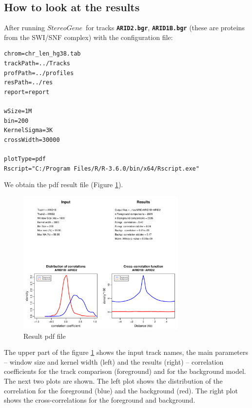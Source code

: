\documentclass{article}
\newcommand{\tw}{\textwidth}
\newcommand{\prm}[1]{\texttt{\textbf{{#1}}}}
\newcommand{\sg}{$StereoGene$\ }
\begin{document}
\subsection{How to look at the results}
After running \sg for tracks \prm{ARID2.bgr}, \prm{ARID1B.bgr} (these are proteins from the SWI/SNF complex) with the configuration file:
\begin{shaded} 
\begin{footnotesize}
\begin{verbatim}
chrom=chr_len_hg38.tab
trackPath=../Tracks
profPath=../profiles
resPath=../res
report=report

wSize=1M
bin=200
KernelSigma=3K
crossWidth=30000

plotType=pdf
Rscript="C:/Program Files/R/R-3.6.0/bin/x64/Rscript.exe"
\end{verbatim}
\end{footnotesize}
\end{shaded}
We obtain the pdf result file (Figure \ref{res1}).
\begin{center}
\begin{figure}[!h]
\includegraphics[width=0.75\tw]{fig/ARID1B~ARID2.pdf}
\caption{Result pdf file}\label{res1}
\end{figure}
\end{center}


The upper part of the figure \ref{res1} shows the input track names, the main parameters -- window size and kernel width (left) and the results (right) -- correlation coefficients for the track comparison (foreground) and for the background model. 
The next two plots are shown. The left plot shows the distribution of the correlation for the foreground (blue) and the background (red). The right plot shows the cross-correlations for the foreground and background.
\end{document}

